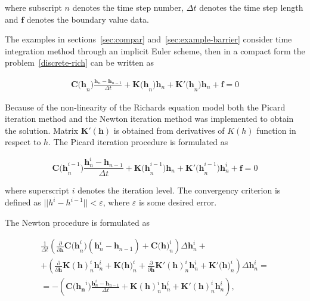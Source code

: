\documentclass[final,3p,times,twocolumn]{elsarticle}
\begin{document}
where subscript $n$ denotes the time step number, $\Delta t$ denotes the time step length and $\mathbf{f}$ denotes the boundary value data.

The examples in sections~\ref{sec:compar} and~\ref{sec:example-barrier} consider time integration method through an implicit Euler scheme, then in a compact form the  problem~\eqref{discrete-rich} can be written as

\begin{equation}
\begin{split}
\mathbf{C(h}_n^{}) \frac{\mathbf{h}_{n}-\mathbf{h}_{n-1}}{\Delta t} +  \mathbf{K(h}_n^{})\mathbf{h}_n + \mathbf{K'(h}_n^{})\mathbf{h}_n +  \mathbf{f} = 0 
\end{split}
\end{equation}

Because of the non-linearity of the Richards equation model both the Picard iteration method and the Newton iteration method was implemented to obtain the solution. Matrix $\mathbf{K'(h)}$ is obtained  from derivatives of $K(h)$ function in respect to $h$.
The Picard iteration procedure is formulated as

\begin{equation*}
\mathbf{C(h}_n^{i-1}) \frac{\mathbf{h}_{n}^i-\mathbf{h}_{n-1}}{\Delta t} +  \mathbf{K(h}_n^{i-1})\mathbf{h}_n + \mathbf{K'(h}_n^{i-1})\mathbf{h}_n^i +  \mathbf{f} = 0 
\end{equation*}

where superscript $i$ denotes the iteration level. The convergency criterion is defined as $||h^i - h^{i-1}|| < \varepsilon$, where $\varepsilon$ is some desired error. 

The Newton procedure is formulated as

\begin{equation*}
\begin{split}
\frac{1}{\Delta t} \left( \frac{\partial }{\partial \mathbf{h}} \mathbf{C(h}_n^{i})(\mathbf{h}_n^{i}-\mathbf{h}_{n-1}) + \mathbf{C(h})_{n}^i \right)\Delta \mathbf{h}_n^i + \\ + \left(\frac{\partial }{\partial \mathbf{h}}
\mathbf{K(h)}_n^i\mathbf{h}^i_n + \mathbf{K}(\mathbf{h)}_n^i + \frac{\partial }{\partial \mathbf{h}}
\mathbf{K'(h)}_n^i\mathbf{h}^i_n + \mathbf{K'}(\mathbf{h)}_n^i \right) \Delta \mathbf{h}^i_n = \\ = - \left(\mathbf{C(h_n}^i)\frac{\mathbf{h}_n^i - \mathbf{h}_{n-1}}{\Delta t} + \mathbf{K(h)}_n^i\mathbf{h}^i_n + \mathbf{K'(h)}_n^i\mathbf{h}^i_n \right) ,
\end{split}
\end{equation*}
\end{document}
